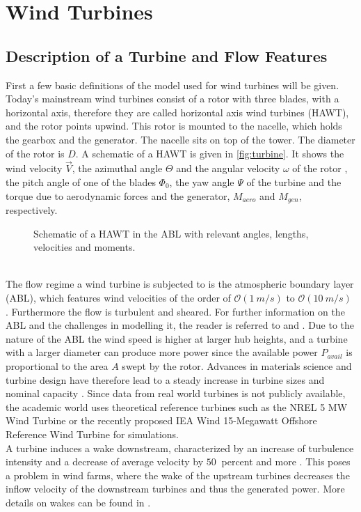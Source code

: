 \section{Wind Turbines}
\subsection{Description of a Turbine and Flow Features}
First a few basic definitions of the model used for wind turbines will be given. Today's mainstream wind turbines consist of a rotor with three blades, with a horizontal axis, therefore they are called horizontal axis wind turbines (HAWT), and the rotor points upwind.  This rotor is mounted to the nacelle, which holds the gearbox and the generator. The nacelle sits on top of the tower. The diameter of the rotor is $D$. A schematic of a HAWT is given in \autoref{fig:turbine}. It shows the wind velocity $\vec{V}$, the azimuthal angle $\Theta$ and the angular velocity $\omega$ of the rotor , the pitch angle of one of the blades $\Phi_0$, the yaw angle $\Psi$ of the turbine and the torque due to aerodynamic forces and the generator, $M_{aero}$ and $M_{gen}$, respectively.
\begin{figure}[h]
	\centering
	\def\svgwidth{0.5 \textwidth}
	
	\caption{Schematic of a HAWT in the ABL with relevant angles, lengths, velocities and moments.}
	\label{fig:turbine}
\end{figure}\\
The flow regime a wind turbine is subjected to is the atmospheric boundary layer (ABL), which features wind velocities of the order of $\mathcal{O}(\SI{1}{m/s})$ to $\mathcal{O}(\SI{10}{m/s})$ \cite[p. 5]{kaimal_atmospheric_1994}. Furthermore the flow is turbulent and sheared. For further information on the ABL and the challenges in modelling it, the reader is referred to \cite{kaimal_atmospheric_1994} and \cite{holtslag_stable_2013}. Due to the nature of the ABL the wind speed is higher at larger hub heights, and a turbine with a larger diameter can produce more power since the available power $P_{avail}$ is proportional to the area $A$ swept by the rotor. Advances in materials science and turbine design have therefore lead to a steady increase in turbine sizes and nominal capacity \cite{rohrig_powering_2019}. Since data from real world turbines is not publicly available, the academic world uses theoretical reference turbines such as the NREL 5 MW Wind Turbine \cite{jonkman_definition_2009} or the recently proposed IEA Wind 15-Megawatt Offshore Reference Wind Turbine \cite{gaertner_iea_2020} for simulations.\cite{hansen_aerodynamics_2008} \\
A turbine induces a wake downstream, characterized by an increase of turbulence intensity and a decrease of average velocity by $\SI{50}{}$ percent and more \cite{abkar_wake_2016}. This poses a problem in wind farms, where the wake of the upstream turbines decreases the inflow velocity of the downstream turbines and thus the generated power. More details on wakes can be found in \cite{boersma_tutorial_2017}.

